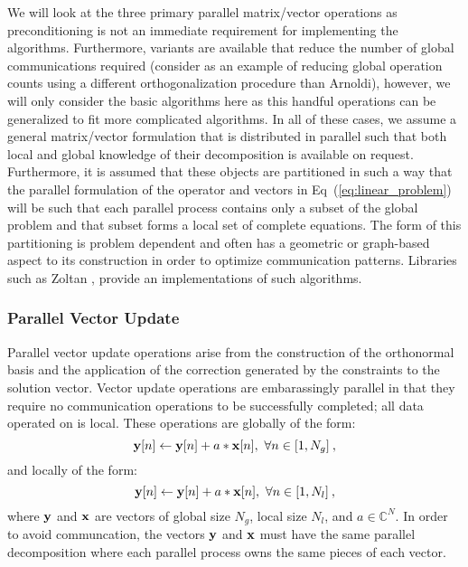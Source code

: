 We will look at the three primary parallel matrix/vector operations as
preconditioning is not an immediate requirement for implementing the
algorithms. Furthermore, variants are available that reduce the number
of global communications required (consider
\cite{sosonkina_scalable_1998} as an example of reducing global
operation counts using a different orthogonalization procedure than
Arnoldi), however, we will only consider the basic algorithms here as
this handful operations can be generalized to fit more complicated
algorithms. In all of these cases, we assume a general matrix/vector
formulation that is distributed in parallel such that both local and
global knowledge of their decomposition is available on
request. Furthermore, it is assumed that these objects are partitioned
in such a way that the parallel formulation of the operator and
vectors in Eq~(\ref{eq:linear_problem}) will be such that each
parallel process contains only a subset of the global problem and that
subset forms a local set of complete equations. The form of this
partitioning is problem dependent and often has a geometric or
graph-based aspect to its construction in order to optimize
communication patterns. Libraries such as Zoltan
\citep{devine_zoltan_2002}, provide an implementations of such
algorithms.

\subsubsection{Parallel Vector Update}
\label{subsubsec:parallel_vec_update}
Parallel vector update operations arise from the construction of the
orthonormal basis and the application of the correction generated by
the constraints to the solution vector. Vector update operations are
embarassingly parallel in that they require no communication
operations to be successfully completed; all data operated on is
local. These operations are globally of the form:
\begin{equation}
  \ve{y}[n] \leftarrow \ve{y}[n] + a * \ve{x}[n],\ \forall n \in [1,N_g]
  \:,
  \label{eq:global_vector_update}
\end{equation}
and locally of the form:
\begin{equation}
  \mathbf{y}[n] \leftarrow \mathbf{y}[n] + a * \mathbf{x}[n],\ \forall n \in [1,N_l]
  \:,
  \label{eq:local_vector_update}
\end{equation}
where $\mathbf{y}$ and $\mathbf{x}$ are vectors of global size $N_g$, local
size $N_l$, and $a \in \mathbb{C}^N$. In order to avoid communcation,
the vectors $\mathbf{y}$ and $\mathbf{x}$ must have the same parallel
decomposition where each parallel process owns the same pieces of each
vector. 

